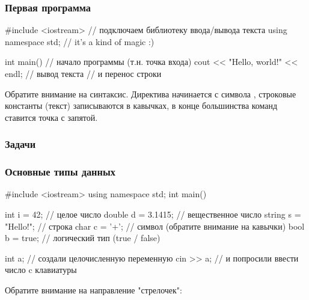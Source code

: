 


\begin{frame}[fragile]
	\frametitle{Первая программа}
	\begin{code}
#include <iostream> // подключаем библиотеку ввода/вывода текста
using namespace std; // it's a kind of magic :)

int main() // начало программы (т.н. точка входа)
{
	cout << "Hello, world!" << endl; // вывод текста
                                     // и перенос строки
}
	\end{code}
	Обратите внимание на синтаксис. Директива  начинается с
	символа \lcode{#}, строковые константы (текст) записываются в кавычках, в
	конце большинства команд ставится точка с запятой. 
\end{frame}

\begin{frame}
	\frametitle{Задачи}
\end{frame}

\begin{frame}[fragile]
	\frametitle{Основные типы данных} 
	\begin{code}
#include <iostream>
using namespace std;
int main()
{
	int i = 42; // целое число
	double d = 3.1415; // вещественное число
	string s = "Hello!"; // строка
	char c = '+'; // символ (обратите внимание на кавычки)
	bool b = true; // логический тип (true / false)
	
	int a; // создали целочисленную переменную
	cin >> a; // и попросили ввести число c клавиатуры
}
	\end{code}
	Обратите внимание на направление "стрелочек": \\ 
\end{frame}

